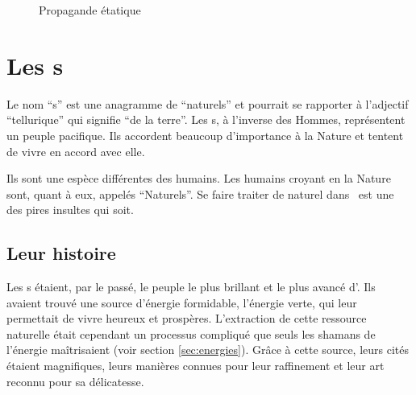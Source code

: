 \begin{figure}[ht!]
	\hspace*{.04\textwidth}
	\caption{\label{fig:propagandeEtatique}Propagande étatique}
\end{figure}



\section{Les \nomNaturels s}
Le nom \enquote{\nomNaturels s} est une anagramme de \enquote{naturels} et pourrait se rapporter à l'adjectif \enquote{tellurique} qui signifie \enquote{de la terre}. Les \nomNaturels s, à l'inverse des Hommes, représentent un peuple pacifique. Ils accordent beaucoup d'importance à la Nature et tentent de vivre en accord avec elle.

Ils sont une espèce différentes des humains. Les humains croyant en la Nature sont, quant à eux, appelés \enquote{Naturels}. Se faire traiter de naturel dans \nomVille\ est une des pires insultes qui soit.


\subsection{Leur histoire}
\label{sec:histoireNaturels}
Les \nomNaturels s étaient, par le passé, le peuple le plus brillant et le plus avancé d'\nomUnivers. Ils avaient trouvé une source d'énergie formidable, l'énergie verte, qui leur permettait de vivre heureux et prospères. L'extraction de cette ressource naturelle était cependant un processus compliqué que seuls les shamans de l'énergie maîtrisaient (voir section \ref{sec:energies}). Grâce à cette source, leurs cités étaient magnifiques, leurs manières connues pour leur raffinement et leur art reconnu pour sa délicatesse.

